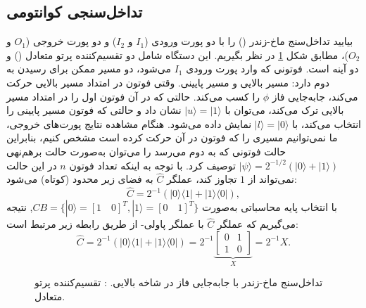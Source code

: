\subsection{تداخل‌سنجی کوانتومی}
\label{subsec:11-1-1}
بیایید تداخل‌سنج ماخ-زندر () را با دو پورت ورودی ($I_1$ و $I_2$) و دو پورت خروجی ($O_1$ و $O_2$)، مطابق شکل \ref{fig:11-1} در نظر بگیریم. این دستگاه شامل دو تقسیم‌کننده پرتو متعادل () و دو آینه است. فوتونی که وارد پورت ورودی $I_1$ می‌شود، دو مسیر ممکن برای رسیدن به  دوم دارد: مسیر بالایی و مسیر پایینی. وقتی فوتون در امتداد مسیر بالایی حرکت می‌کند، جابه‌جایی فاز $\phi$ را کسب می‌کند. حالتی که در آن فوتون  اول را در امتداد مسیر بالایی ترک می‌کند، می‌توان با $|u\rangle = |1\rangle$ نشان داد و حالتی که فوتون مسیر پایینی را انتخاب می‌کند، با $|l\rangle = |0\rangle$ نمایش داده می‌شود. هنگام مشاهده نتایج پورت‌های خروجی، ما نمی‌توانیم مسیری را که فوتون در آن حرکت کرده است مشخص کنیم، بنابراین حالت فوتونی که به  دوم می‌رسد را می‌توان به‌صورت حالت برهم‌نهی $|\psi\rangle = 2^{-1/2}(|0\rangle + |1\rangle)$ توصیف کرد. با توجه به اینکه تعداد فوتون $n$ در این حالت نمی‌تواند از $1$ تجاوز کند، عملگر $\hat{C}$ به فضای زیر محدود (کوتاه) می‌شود:
\begin{equation}
	\hat{C} = 2^{-1}(|0\rangle \langle 1| + |1\rangle \langle 0|),
	\label{eq:11-22}
\end{equation}
با انتخاب پایه محاسباتی به‌صورت $CB = \{|0\rangle = [1 \quad 0]^T, |1\rangle = [0 \quad 1]^T \}$, نتیجه می‌گیریم که عملگر $\hat{C}$ با عملگر پاولی- از طریق رابطه زیر مرتبط است:
\begin{equation}
	\hat{C} = 2^{-1}(|0\rangle \langle 1| + |1\rangle \langle 0|) = 2^{-1} \underbrace{\begin{bmatrix} 0 & 1 \\ 1 & 0 \end{bmatrix}}_{X} = 2^{-1}X.
	\label{eq:11-23}
\end{equation}

\begin{figure}[ht]
	\centering
	\caption{تداخل‌سنج ماخ-زندر با جابه‌جایی فاز در شاخه بالایی. : تقسیم‌کننده پرتو متعادل.}
	\label{fig:11-1}
\end{figure}


